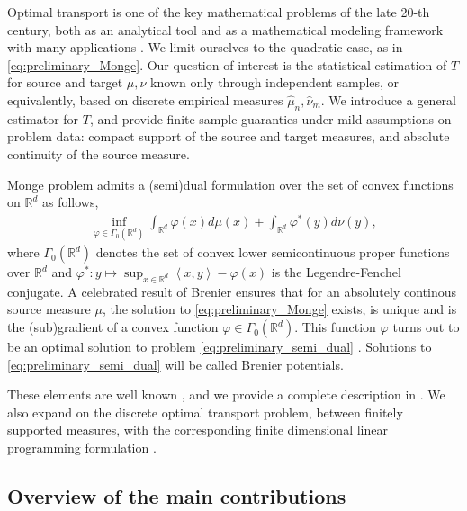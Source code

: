 \documentclass[11pt]{article}
\newcommand{\R}{\mathbb R}
\newcommand{\1}{\mathbbm{1}}
\numberwithin{equation}{section}
\begin{document}
Optimal transport is one of the key mathematical problems of the late 20-th century, both as an analytical tool and as a mathematical modeling framework with many applications \cite{villani_opt_old_new,book_santambrogio,peyre2019computational}. We limit ourselves to the quadratic case, as in \eqref{eq:preliminary_Monge}. Our question of interest is the statistical estimation of $T$ for source and target $\mu,\nu$ known only through independent samples, or equivalently, based on discrete empirical measures $\hat{\mu}_n,\hat{\nu}_m$. We introduce a general estimator for $T$, and provide finite sample guaranties under mild assumptions on problem data: compact support of the source and target measures, and absolute continuity of the source measure.

Monge problem admits a (semi)dual formulation over the set of convex functions on $\R^d$ as follows,
\begin{align}
    \label{eq:preliminary_semi_dual}
    \inf_{\varphi\in \Gamma_0(\R^d)} \int_{\R^d} \varphi(x) d\mu(x) + \int_{\R^d}\varphi^*(y) d\nu(y),
\end{align}
where $\Gamma_0(\R^d)$ denotes the set of convex lower semicontinuous proper functions  over $\R^d$ and $\varphi^* \colon y \mapsto \sup_{x \in \R^d} \left\langle x, y \right\rangle - \varphi(x)$ is the Legendre-Fenchel conjugate. A celebrated result of Brenier \cite{brenier1991polar} ensures that for an absolutely continous source measure $\mu$, the solution to \eqref{eq:preliminary_Monge} exists, is unique and is the (sub)gradient of a convex function $\varphi \in \Gamma_0(\R^d)$. This function $\varphi$ turns out to be an optimal solution to problem \eqref{eq:preliminary_semi_dual} \cite{book_santambrogio}. Solutions to \eqref{eq:preliminary_semi_dual} will be called Brenier potentials. 

These elements are well known \cite{villani_opt_old_new,ref_villani_topics, book_santambrogio}, and we provide a complete description in . We also expand on the discrete optimal transport problem, between finitely supported measures, with the corresponding finite dimensional linear programming formulation \cite{peyre2019computational}.

\subsection{Overview of the main contributions}
\end{document}
